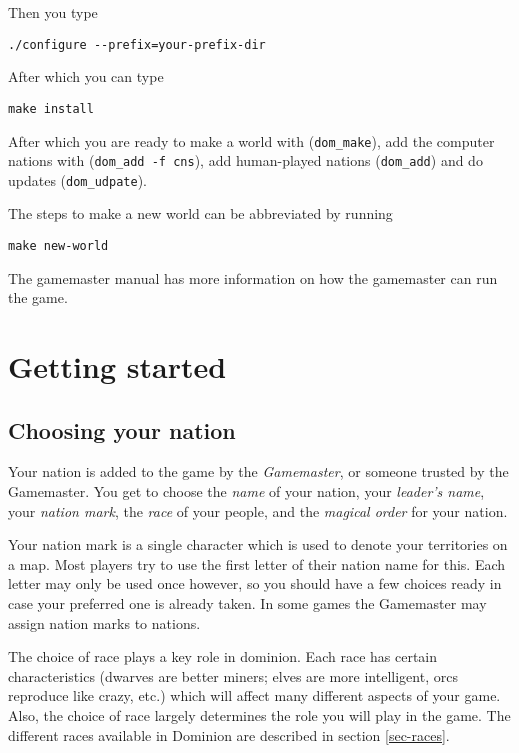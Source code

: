 Then you type
\begin{verbatim}
./configure --prefix=your-prefix-dir
\end{verbatim}

After which you can type
\begin{verbatim}
make install
\end{verbatim}

After which you are ready to make a world with ({\tt dom_make}), add the
computer nations with ({\tt dom_add -f cns}), add human-played nations
({\tt dom_add}) and do updates ({\tt dom_udpate}).

The steps to make a new world can be abbreviated by running

\begin{verbatim}
make new-world
\end{verbatim}	

The gamemaster manual has more information on how the gamemaster can
run the game.


\chapter{Getting started}

\section{Choosing your nation}

Your nation is added to the game by the {\em Gamemaster}, or someone
trusted by the Gamemaster.  You get to choose the {\em name} of your
nation, your {\em leader's name}, your {\em nation mark}, the {\em
race} of your people, and the {\em magical order} for your nation.

Your nation mark is a single character which is used to denote your
territories on a map.  Most players try to use the first letter of
their nation name for this.  Each letter may only be used once
however, so you should have a few choices ready in case your preferred
one is already taken.  In some games the Gamemaster may assign nation
marks to nations.

The choice of race plays a key role in dominion. Each race has certain
characteristics (dwarves are better miners; elves are more
intelligent, orcs reproduce like crazy, etc.) which will affect many
different aspects of your game. Also, the choice of race largely
determines the role you will play in the game. The different races
available in Dominion are described in section \ref{sec-races}.

